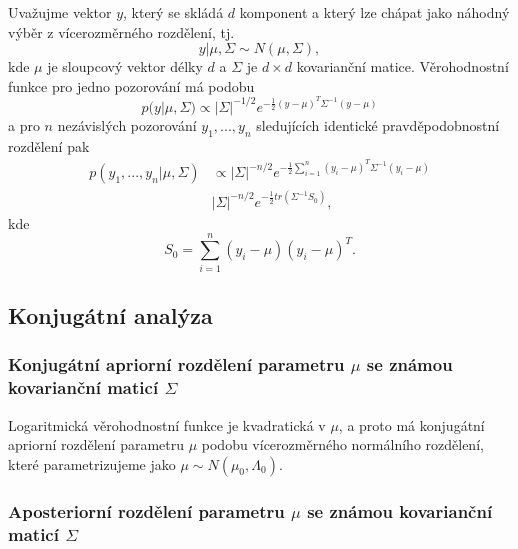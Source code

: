 Uvažujme vektor $y$, který se skládá $d$ komponent a který lze chápat jako náhodný výběr z vícerozměrného rozdělení, tj.
\begin{equation}
y | \mu, \Sigma \sim N(\mu, \Sigma),
\end{equation}
kde $\mu$ je sloupcový vektor délky $d$ a $\Sigma$ je $d \times d$ kovarianční matice. Věrohodnostní funkce pro jedno pozorování má podobu
\begin{equation}
p(y | \mu, \Sigma) \varpropto |\Sigma|^{-1/2}e^{-\frac{1}{2}(y - \mu)^T \Sigma^{-1}(y - \mu)}
\end{equation}
a pro $n$ nezávislých pozorování $y_1, ..., y_n$ sledujících identické pravděpodobnostní rozdělení pak
\begin{equation}
\begin{split}
p(y_1, ..., y_n|\mu, \Sigma) & \varpropto |\Sigma|^{-n/2} e^{-\frac{1}{2} \sum_{i = 1}^n (y_i - \mu)^T \Sigma^{-1} (y_i - \mu)}\\
 & |\Sigma|^{-n/2}e^{-\frac{1}{2}tr(\Sigma^{-1}S_0)},
\end{split}
\end{equation}
kde
\begin{equation}
S_0 = \sum_{i = 1}^n (y_i - \mu)(y_i - \mu)^T.
\end{equation}

\subsection{Konjugátní analýza}

\subsubsection{Konjugátní apriorní rozdělení parametru $\mu$ se známou kovarianční maticí $\Sigma$}

Logaritmická věrohodnostní funkce je kvadratická v $\mu$, a proto má konjugátní apriorní rozdělení parametru $\mu$ podobu vícerozměrného normálního rozdělení, které parametrizujeme jako $\mu \sim N(\mu_0, \Lambda_0)$.

\subsubsection{Aposteriorní rozdělení parametru $\mu$ se známou kovarianční maticí $\Sigma$}

